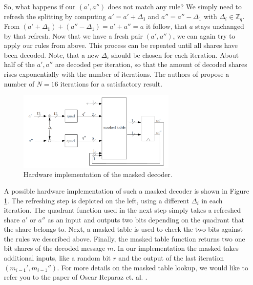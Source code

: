 So, what happens if our \((a', a'')\) does not match any rule? We simply need to refresh the splitting by computing \(a' = a' + \Delta_1\) and \(a'' = a'' - \Delta_1\) with \(\Delta_i \in \mathbb{Z}_q\). From \((a' + \Delta_1) + (a'' - \Delta_1) = a' + a'' = a\) it follow, that \(a\) stays unchanged by that refresh. Now that we have a fresh pair \((a',a'')\), we can again try to apply our rules from above. This process can be repeated until all shares have been decoded. Note, that a new \(\Delta_i\) should be chosen for each iteration. About half of the \(a',a''\) are decoded per iteration, so that the amount of decoded shares rises exponentially with the number of iterations. The authors of \cite{maskedRing} propose a number of \(N = 16\) iterations for a satisfactory result.
\begin{figure}[H]
	\centering
	\includegraphics[width=0.7\textwidth]{maskedDecoder_2.png}
	\caption{Hardware implementation of the masked decoder. \cite{maskedRing}}
	\label{maskedDecoder_2}
\end{figure}
A possible hardware implementation of such a masked decoder is shown in Figure \ref{maskedDecoder_2}. The refreshing step is depicted on the left, using a different \(\Delta_i\) in each iteration. The quadrant function used in the next step simply takes a refreshed share \(a'\) or \(a''\) as an input and outputs two bits depending on the quadrant that the share belongs to. Next, a masked table is used to check the two bits against the rules we described above. Finally, the masked table function returns two one bit shares of the decoded message \(\textit{m}\). In our implementation the masked takes additional inputs, like a random bit \(r\) and the output of the last iteration \((m_{i-1}',m_{i-1}'')\). For more details on the masked table lookup, we would like to refer you to the paper of Oscar Reparaz et. al. \cite{maskedRing}.



